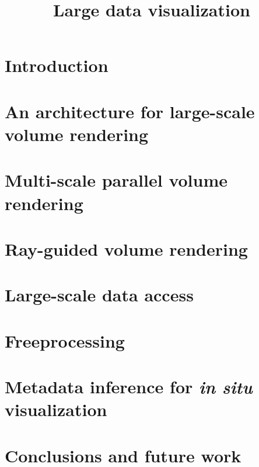 \documentclass[12pt,twoside,headsepline,titlepage]{thesis}
\title{Large data visualization}
\begin{document}

\newpage


\chapter{Introduction}


\chapter{An architecture for large-scale volume rendering}


\chapter{Multi-scale parallel volume rendering}
\label{chp:multiscale}


\chapter{Ray-guided volume rendering}


\chapter{Large-scale data access}


\chapter{Freeprocessing}


\chapter{Metadata inference for \textit{in situ} visualization}


\chapter{Conclusions and future work}




\end{document}

